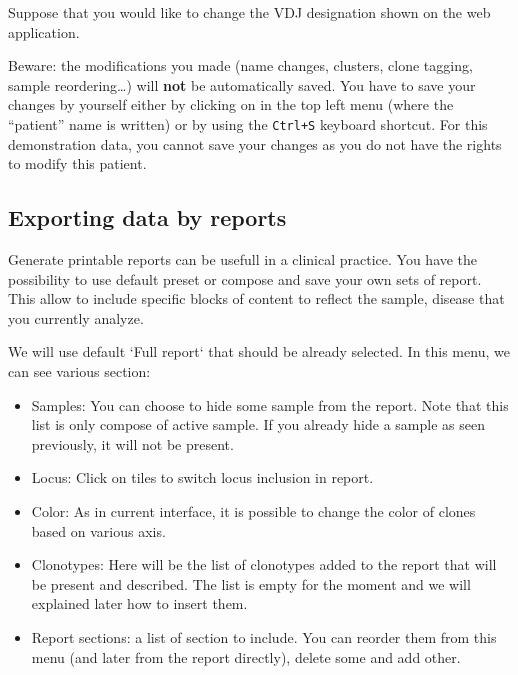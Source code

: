\bigskip

Suppose that you would like to change the VDJ designation shown on the web application.

Beware: the modifications you made (name changes, clusters, clone
tagging, sample reordering\dots) will \textbf{not} be automatically saved. You have to save
your changes by yourself either by clicking on  in the top left menu (where the
``patient'' name is written) or by using the \texttt{Ctrl+S} keyboard
shortcut.
For this demonstration data, you cannot save your changes as you do not have
the rights to modify this patient.

\subsection{Exporting data by reports}

Generate printable reports can be usefull in a clinical practice.
You have the possibility to use default preset or compose and save your own sets of report.
This allow to include specific blocks of content to reflect the sample, disease that you currently analyze. %


We will use default `Full report` that should be already selected.
In this menu, we can see various section:
\begin{itemize}
\item Samples: You can choose to hide some sample from the report. Note that this list is only compose of active sample. If you already hide a sample as seen previously, it will not be present.
\item Locus: Click on tiles to switch locus inclusion in report.
\item Color: As in current interface, it is possible to change the color of clones based on various axis.
\item Clonotypes: Here will be the list of clonotypes added to the report that will be present and described. The list is empty for the moment and we will explained later how to insert them.
\item Report sections: a list of section to include. You can reorder them from this menu (and later from the report directly), delete some and add other.
\end{itemize}

